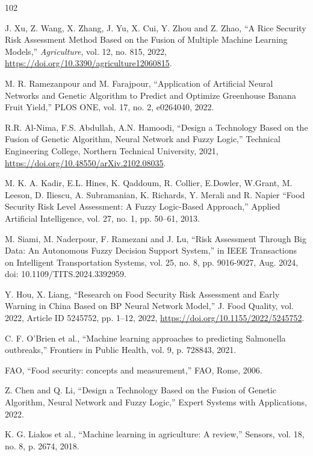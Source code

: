 \documentclass[preprint,12pt]{elsarticle}
\begin{document}
	\begin{thebibliography}{102}
		
		J. Xu, Z. Wang, X. Zhang, J. Yu, X. Cui, Y. Zhou and Z. Zhao, ``A Rice Security Risk Assessment Method Based on the Fusion of Multiple Machine Learning Models,'' \emph{Agriculture}, vol. 12, no. 815, 2022, \url{https://doi.org/10.3390/agriculture12060815}.
		
		M. R. Ramezanpour and M. Farajpour, ``Application of Artificial Neural Networks and Genetic Algorithm to Predict and Optimize Greenhouse Banana Fruit Yield,'' PLOS ONE, vol. 17, no. 2, e0264040, 2022.
		
		R.R. Al-Nima, F.S. Abdullah, A.N. Hamoodi, ``Design a Technology Based on the Fusion of Genetic Algorithm, Neural Network and Fuzzy Logic,'' Technical Engineering College, Northern Technical University, 2021, \url{https://doi.org/10.48550/arXiv.2102.08035}.
		
		M. K. A. Kadir, E.L. Hines, K. Qaddoum, R. Collier, E.Dowler, W.Grant, M. Leeson, D. Iliescu, A. Subramanian, K. Richards, Y. Merali and R. Napier ``Food Security Risk Level Assessment: A Fuzzy Logic-Based Approach,'' Applied Artificial Intelligence, vol. 27, no. 1, pp. 50--61, 2013.
		
		M. Siami, M. Naderpour, F. Ramezani and J. Lu, ``Risk Assessment Through Big Data: An Autonomous Fuzzy Decision Support System,'' in IEEE Transactions on Intelligent Transportation Systems, vol. 25, no. 8, pp. 9016-9027, Aug. 2024, doi: 10.1109/TITS.2024.3392959.
		
		Y. Hou, X. Liang, ``Research on Food Security Risk Assessment and Early Warning in China Based on BP Neural Network Model,'' J. Food Quality, vol. 2022, Article ID 5245752, pp. 1--12, 2022, \url{https://doi.org/10.1155/2022/5245752}.
		
		C. F. O'Brien et al., ``Machine learning approaches to predicting Salmonella outbreaks,'' Frontiers in Public Health, vol. 9, p. 728843, 2021.
		
		FAO, ``Food security: concepts and measurement,'' FAO, Rome, 2006.
		
		Z. Chen and Q. Li, ``Design a Technology Based on the Fusion of Genetic Algorithm, Neural Network and Fuzzy Logic,'' Expert Systems with Applications, 2022.
		
		K. G. Liakos et al., ``Machine learning in agriculture: A review,'' Sensors, vol. 18, no. 8, p. 2674, 2018.
		

\end{thebibliography}
\end{document}
